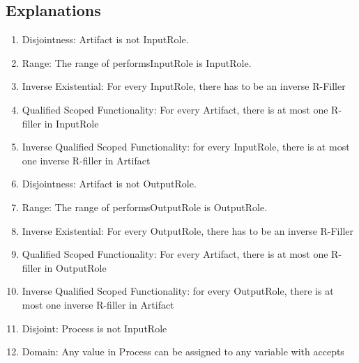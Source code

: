 \subsection{Explanations}
\label{exp:1d}
\begin{enumerate}
    \item  Disjointness: \textsf{Artifact} is not \textsf{InputRole}.
    \item  Range: The range of \textsf{performsInputRole} is \textsf{InputRole}. 
    \item   Inverse Existential: For every \textsf{InputRole}, there has to be an inverse R-Filler %
    \item  Qualified Scoped Functionality: For every \textsf{Artifact}, there is at most one R-filler in \textsf{InputRole} %
    \item  Inverse Qualified Scoped Functionality: for every \textsf{InputRole}, there is at most one inverse R-filler in \textsf{Artifact} %
    \item  Disjointness: \textsf{Artifact} is not \textsf{OutputRole}.
    \item  Range: The range of \textsf{performsOutputRole} is \textsf{OutputRole}. 
    \item   Inverse Existential: For every \textsf{OutputRole}, there has to be an inverse R-Filler %
    \item  Qualified Scoped Functionality: For every \textsf{Artifact}, there is at most one R-filler in \textsf{OutputRole} %
    \item  Inverse Qualified Scoped Functionality: for every \textsf{OutputRole}, there is at most one inverse R-filler in \textsf{Artifact} %
    \item Disjoint: \textsf{Process} is not \textsf{InputRole}  %
    \item Domain: Any value in \textsf{Process} can be assigned to any variable with \textsf{accepts} %

\end{enumerate}
